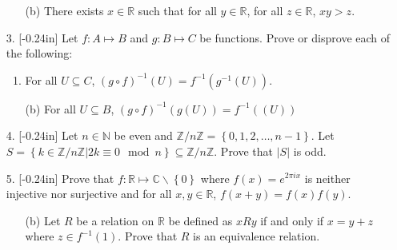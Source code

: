 \documentclass[letterpaper,12pt]{article}
\newcommand{\set}[1]{\left\{ #1 \right\}}
\theoremstyle{definition}
\begin{document}
\pagebreak
\begin{enumerate}
    \item[] \begin{enumerate}
        \item[(b)] There exists $x \in \mathbb{R}$ such that for all $y \in \mathbb{R}$, for all $z \in \mathbb{R}$, $xy > z$.
    \end{enumerate}
\end{enumerate}
\pagebreak
\begin{enumerate}
    \item[3. ]\reversemarginpar{}[-0.24in] Let $f: A \mapsto B$ and $g: B \mapsto C$ be functions. Prove or disprove each of the following: \begin{enumerate}
        \item For all $U \subseteq C$, $(g \circ f)^{-1} (U) = f^{-1}(g^{-1}(U))$.
        
    \end{enumerate}
\end{enumerate}
\pagebreak
\begin{enumerate}
    \item[] \begin{enumerate}
        \item[(b)] For all $U \subseteq B$, $(g\circ f)^{-1}(g(U)) = f^{-1}((U))$
    \end{enumerate}
\end{enumerate}
\pagebreak
\begin{enumerate}
    \item[4.]\reversemarginpar{}[-0.24in] Let $n \in \mathbb{N}$ be even and $\mathbb{Z} / n\mathbb{Z} = \set{0,1,2,\ldots,n-1}$. Let $S = \set{k \in \mathbb{Z} / n\mathbb{Z}| 2k \equiv 0 \mod n } \subseteq \mathbb{Z} / n\mathbb{Z}$. Prove that $|S|$ is odd.
\end{enumerate}
\pagebreak
\begin{enumerate}
    \item[5.]  \reversemarginpar{}[-0.24in] Prove that $f: \mathbb{R} \mapsto \mathbb{C}\backslash \set{0}$ where $f(x) = e^{2\pi i x}$ is neither injective nor surjective and for all $x,y \in \mathbb{R}$, $f(x+y) = f(x)f(y)$.
\end{enumerate}
\pagebreak
\begin{enumerate}
    \item[] \begin{enumerate}
        \item[(b)] Let $R$ be a relation on $\mathbb{R}$ be defined as $x R y$ if and only if $x = y + z$ where $z \in f^{-1}(1)$. Prove that $R$ is an equivalence relation.
    \end{enumerate}
\end{enumerate}
\end{document}
